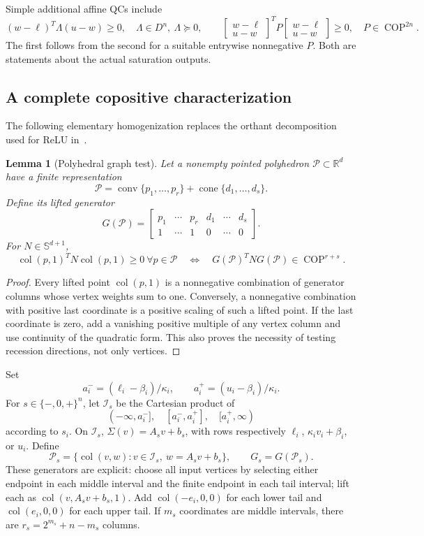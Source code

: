 \documentclass[10pt,a4paper]{article}
\newtheorem{lemma}{Lemma}
\theoremstyle{definition}
\theoremstyle{remark}
\newcommand{\R}{\mathbb R}
\newcommand{\Ss}{\mathbb S}
\newcommand{\COP}{\operatorname{COP}}
\newcommand{\col}{\operatorname{col}}
\newcommand{\conv}{\operatorname{conv}}
\newcommand{\cone}{\operatorname{cone}}
\begin{document}
Simple additional affine QCs include
\begin{equation}\label{eq:amplitude}
 (w-\ell)^T\Lambda(u-w)\ge0,\quad\Lambda\in D^n,\ \Lambda\succeq0,
 \qquad
 \begin{bmatrix}w-\ell\\u-w\end{bmatrix}^TP
 \begin{bmatrix}w-\ell\\u-w\end{bmatrix}\ge0,\quad P\in\COP^{2n}.
\end{equation}
The first follows from the second for a suitable entrywise nonnegative $P$. Both are statements about the actual saturation outputs.

\subsection{A complete copositive characterization}
The following elementary homogenization replaces the orthant decomposition used for ReLU in~\cite{relu}.

\begin{lemma}[Polyhedral graph test]\label{lem:poly}
Let a nonempty pointed polyhedron $\mathcal P\subset\R^d$ have a finite representation
\[
 \mathcal P=\conv\{p_1,\ldots,p_r\}+\cone\{d_1,\ldots,d_s\}.
\]
Define its lifted generator
\begin{equation}\label{eq:generator}
 G(\mathcal P)=
 \begin{bmatrix}p_1&\cdots&p_r&d_1&\cdots&d_s\\1&\cdots&1&0&\cdots&0\end{bmatrix}.
\end{equation}
For $N\in\Ss^{d+1}$,
\[
 \col(p,1)^TN\col(p,1)\ge0\ \forall p\in\mathcal P
 \quad\Longleftrightarrow\quad
 G(\mathcal P)^TNG(\mathcal P)\in\COP^{r+s}.
\]
\end{lemma}
\begin{proof}
Every lifted point $\col(p,1)$ is a nonnegative combination of generator columns whose vertex weights sum to one. Conversely, a nonnegative combination with positive last coordinate is a positive scaling of such a lifted point. If the last coordinate is zero, add a vanishing positive multiple of any vertex column and use continuity of the quadratic form. This also proves the necessity of testing recession directions, not only vertices.
\end{proof}

Set
\[
 a_i^-=(\ell_i-\beta_i)/\kappa_i,\qquad
 a_i^+=(u_i-\beta_i)/\kappa_i.
\]
For $s\in\{-,0,+\}^n$, let $\mathcal I_s$ be the Cartesian product of
\[
 (-\infty,a_i^-],\quad[a_i^-,a_i^+],\quad[a_i^+,\infty)
\]
according to $s_i$. On $\mathcal I_s$, $\Sigma(v)=A_sv+b_s$, with rows respectively $\ell_i$, $\kappa_iv_i+\beta_i$, or $u_i$. Define
\[
 \mathcal P_s=\{\col(v,w):v\in\mathcal I_s,\ w=A_sv+b_s\},\qquad G_s=G(\mathcal P_s).
\]
These generators are explicit: choose all input vertices by selecting either endpoint in each middle interval and the finite endpoint in each tail interval; lift each as $\col(v,A_sv+b_s,1)$. Add $\col(-e_i,0,0)$ for each lower tail and $\col(e_i,0,0)$ for each upper tail. If $m_s$ coordinates are middle intervals, there are $r_s=2^{m_s}+n-m_s$ columns.
\end{document}
